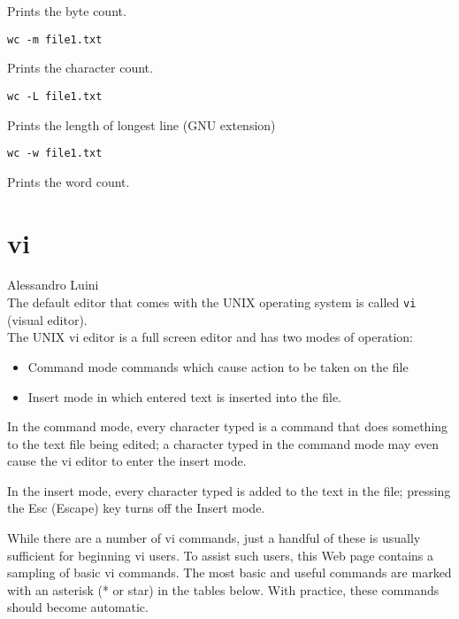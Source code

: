 \documentclass[hidelinks,12pt,a4paper,numbers=enddot]{scrartcl}
\begin{document}
Prints the byte count.

\begin{verbatim}
wc -m file1.txt
\end{verbatim}

Prints the character count.

\begin{verbatim}
wc -L file1.txt
\end{verbatim}

Prints the length of longest line (GNU extension)

\begin{verbatim}
wc -w file1.txt
\end{verbatim}

Prints the word count.

\section{vi}


\large Alessandro Luini \normalsize\\




The default editor that comes with the UNIX operating system is called
\texttt{vi} (visual editor).\\

The UNIX vi editor is a full screen editor and has two modes of operation:


\begin{itemize}
    \item Command mode commands which cause action to be taken on the file
    \item Insert mode in which entered text is inserted into the file.
\end{itemize}



In the command mode, every character typed is a command that does
something to the text file being edited; a character typed in the
command mode may even cause the vi editor to enter the insert mode.




In the insert mode, every character typed is added to the text in the
file; pressing the {Esc} (Escape) key turns off the Insert mode.




While there are a number of vi commands, just a handful of these
is usually sufficient for beginning vi users. To assist such users,
this Web page contains a sampling of basic vi commands. The most
basic and useful commands are marked with an asterisk (* or star)
in the tables below. With practice, these commands should become
automatic.
\end{document}
